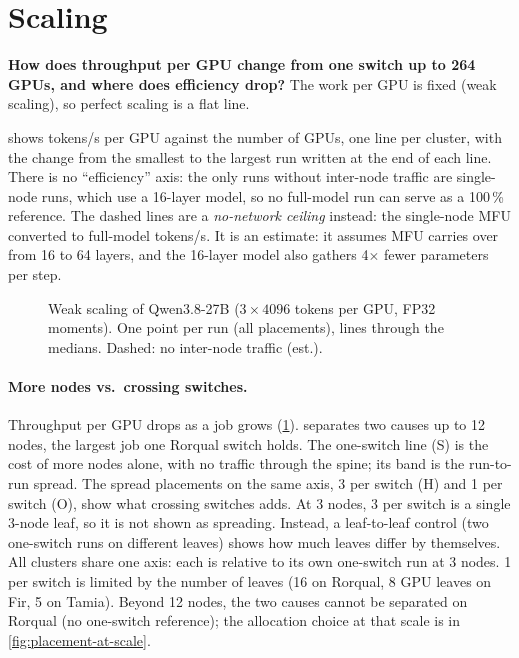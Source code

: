 \section{Scaling}
\label{sec:scaling}

\begin{question}
  \textbf{How does throughput per GPU change from one switch up to 264 GPUs, and where does efficiency
  drop?} The work per GPU is fixed (weak scaling), so perfect scaling is a flat line.
\end{question}

 shows tokens/s per GPU against the number of GPUs, one line per cluster, with the
change from the smallest to the largest run written at the end of each line. There is no ``efficiency''
axis: the only runs without inter-node traffic are single-node runs, which use a 16-layer model, so no
full-model run can serve as a 100\,\% reference. The dashed lines are a \emph{no-network ceiling}
instead: the single-node MFU converted to full-model tokens/s. It is an estimate: it assumes MFU carries
over from 16 to 64 layers, and the 16-layer model also gathers 4$\times$ fewer parameters per step.

\begin{figure}[h]
  \centering{}
  \caption{Weak scaling of Qwen3.8-27B ($3\times4096$ tokens per GPU, FP32 moments). One point per run
    (all placements), lines through the medians. Dashed: no inter-node traffic (est.).
    }
  \label{fig:scaling}
\end{figure}


\paragraph{More nodes vs.\ crossing switches.} Throughput per GPU drops as a job grows (\cref{fig:scaling}).
 separates two causes up to 12 nodes, the largest job one Rorqual switch holds.
The one-switch line (S) is the cost of more nodes alone, with no traffic through the spine; its band is the
run-to-run spread. The spread placements on the same axis, 3 per switch (H) and 1 per switch (O), show what
crossing switches adds. At 3 nodes, 3 per switch is a single 3-node leaf, so it is not shown as spreading.
Instead, a leaf-to-leaf control (two one-switch runs on different leaves) shows how much leaves differ by
themselves. All clusters share one axis: each is relative to its own one-switch run at 3 nodes. 1 per
switch is limited by the number of leaves (16 on Rorqual, 8 GPU leaves on Fir, 5 on Tamia). Beyond 12
nodes, the two causes cannot be separated on Rorqual (no one-switch reference); the allocation choice at
that scale is in \cref{fig:placement-at-scale}.

